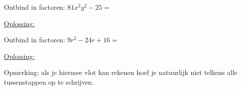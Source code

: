 \documentclass{ximera}
\begin{document}
\begin{example} Ontbind in factoren: $81x^{2}y^{2}-25=$
 \begin{feedback}
     \underline{Oplossing:}
 \end{feedback}

\end{example}
    
\begin{example} Ontbind in factoren: $9r^{2 }-24r+16=$
     \begin{feedback}
         \underline{Oplossing:}
        \end{feedback}
    \end{example}

Opmerking: als je hiermee vlot kan rekenen hoef je natuurlijk niet telkens alle tussenstappen op te schrijven.
\end{document}
